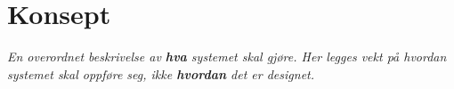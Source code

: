 \section{Konsept}
\label{sec:konsept}
\textit{En overordnet beskrivelse av \textbf{hva} systemet skal gjøre. Her legges vekt på hvordan systemet skal oppføre seg, ikke \textbf{hvordan} det er designet.}
